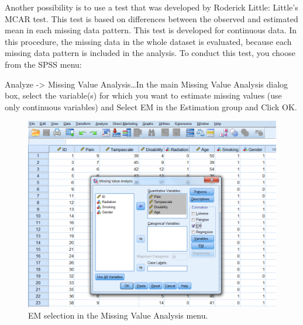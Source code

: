 \documentclass[]{book}
\theoremstyle{definition}
\theoremstyle{definition}
\theoremstyle{definition}
\theoremstyle{remark}
\begin{document}
Another possibility is to use a test that was developed by Roderick
Little: Little's MCAR test. This test is based on differences between
the observed and estimated mean in each missing data pattern. This test
is developed for continuous data. In this procedure, the missing data in
the whole dataset is evaluated, because each missing data pattern is
included in the analysis. To conduct this test, you choose from the SPSS
menu:

Analyze -\textgreater{} Missing Value Analysis\ldots{}In the main
Missing Value Analysis dialog box, select the variable(s) for which you
want to estimate missing values (use only continuous variables) and
Select EM in the Estimation group and Click OK.

\begin{figure}

{\centering \includegraphics[width=0.9\linewidth]{images/fig2.12} 

}

\caption{EM selection in the Missing Value Analysis menu.}\label{fig:fig2-12}
\end{figure}
\end{document}
